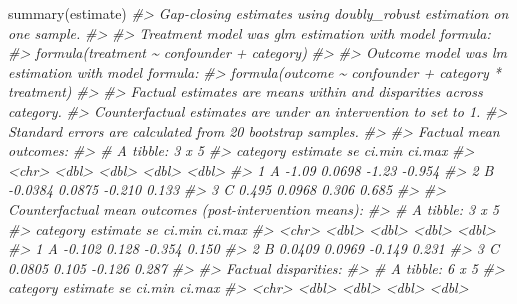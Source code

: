 \documentclass[
]{article}
\newenvironment{Shaded}{\begin{snugshade}}{\end{snugshade}}
\newcommand{\CommentTok}[1]{\textcolor[rgb]{0.56,0.35,0.01}{\textit{#1}}}
\newcommand{\FunctionTok}[1]{\textcolor[rgb]{0.00,0.00,0.00}{#1}}
\newcommand{\NormalTok}[1]{#1}
\begin{document}
\begin{Shaded}
\begin{Highlighting}[]
\FunctionTok{summary}\NormalTok{(estimate)}
\CommentTok{\#\textgreater{} Gap{-}closing estimates using doubly\_robust estimation on one sample.}
\CommentTok{\#\textgreater{} }
\CommentTok{\#\textgreater{} Treatment model was glm estimation with model formula:}
\CommentTok{\#\textgreater{} formula(treatment \textasciitilde{} confounder + category)}
\CommentTok{\#\textgreater{} }
\CommentTok{\#\textgreater{} Outcome model was lm estimation with model formula:}
\CommentTok{\#\textgreater{} formula(outcome \textasciitilde{} confounder + category * treatment)}
\CommentTok{\#\textgreater{} }
\CommentTok{\#\textgreater{} Factual estimates are means within and disparities across category.}
\CommentTok{\#\textgreater{} Counterfactual estimates are under an intervention to set  to 1.}
\CommentTok{\#\textgreater{} Standard errors are calculated from 20 bootstrap samples.}
\CommentTok{\#\textgreater{} }
\CommentTok{\#\textgreater{} Factual mean outcomes:}
\CommentTok{\#\textgreater{} \# A tibble: 3 x 5}
\CommentTok{\#\textgreater{}   category estimate     se ci.min ci.max}
\CommentTok{\#\textgreater{}   \textless{}chr\textgreater{}       \textless{}dbl\textgreater{}  \textless{}dbl\textgreater{}  \textless{}dbl\textgreater{}  \textless{}dbl\textgreater{}}
\CommentTok{\#\textgreater{} 1 A         {-}1.09   0.0698 {-}1.23  {-}0.954}
\CommentTok{\#\textgreater{} 2 B         {-}0.0384 0.0875 {-}0.210  0.133}
\CommentTok{\#\textgreater{} 3 C          0.495  0.0968  0.306  0.685}
\CommentTok{\#\textgreater{} }
\CommentTok{\#\textgreater{} Counterfactual mean outcomes (post{-}intervention means):}
\CommentTok{\#\textgreater{} \# A tibble: 3 x 5}
\CommentTok{\#\textgreater{}   category estimate     se ci.min ci.max}
\CommentTok{\#\textgreater{}   \textless{}chr\textgreater{}       \textless{}dbl\textgreater{}  \textless{}dbl\textgreater{}  \textless{}dbl\textgreater{}  \textless{}dbl\textgreater{}}
\CommentTok{\#\textgreater{} 1 A         {-}0.102  0.128  {-}0.354  0.150}
\CommentTok{\#\textgreater{} 2 B          0.0409 0.0969 {-}0.149  0.231}
\CommentTok{\#\textgreater{} 3 C          0.0805 0.105  {-}0.126  0.287}
\CommentTok{\#\textgreater{} }
\CommentTok{\#\textgreater{} Factual disparities:}
\CommentTok{\#\textgreater{} \# A tibble: 6 x 5}
\CommentTok{\#\textgreater{}   category estimate    se ci.min ci.max}
\CommentTok{\#\textgreater{}   \textless{}chr\textgreater{}       \textless{}dbl\textgreater{} \textless{}dbl\textgreater{}  \textless{}dbl\textgreater{}  \textless{}dbl\textgreater{}}

\end{Highlighting}
\end{Shaded}
\end{document}
